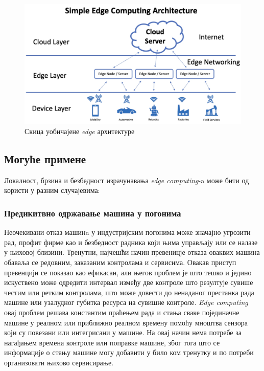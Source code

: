 \begin{figure}[H]
    \centering
    \includegraphics[width=1\textwidth]{images/edge_arch.jpg}
    \caption{Скица уобичајене \textit{edge} архитектуре}
    \label{fig:edge_arch}
\end{figure}

\subsection{Могуће примене}

Локалност, брзина и безбедност израчунавања \textit{edge computing}-a може бити од користи у разним случајевима:

    \subsubsection{Предикитвно одржавање машина у погонима} Неочекивани отказ машинa у индустријским погонима може значајно угрозити рад, профит фирме као и безбедност радника који њима управљају или се налазе у њиховој близини. Тренутни, најчешћи начин превеницје отказа оваквих машина обаваља се редовним, заказаним контролама и сервисима. Овакав приступ превенцији се показао као ефикасан, али његов проблем је што тешко и једино искуствено може одредити интервал између две контроле што резултује сувише честим или ретким контролама, што може довести до ненаданог престанка рада машине или узалудног губитка ресурса на сувишне контроле. \textit{Edge computing} овај проблем решава константим праћењем рада и стања сваке појединачне машине у реалном или приближно реалном времену помоћу мноштва сензора који су повезани или интегрисани у машине. На овај начин нема потребе за нагађањем времена контроле или поправке машине, због тога што се информације о стању машине могу добавити у било ком тренутку и по потреби организовати њихово сервисирање.

